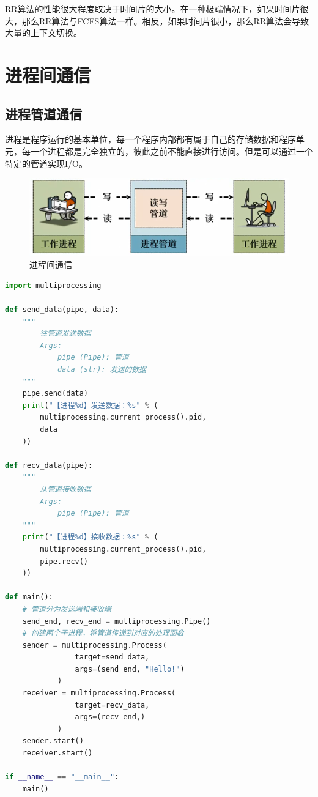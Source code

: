 RR算法的性能很大程度取决于时间片的大小。在一种极端情况下，如果时间片很大，那么RR算法与FCFS算法一样。相反，如果时间片很小，那么RR算法会导致大量的上下文切换。

\newpage

\section{进程间通信}

\subsection{进程管道通信}

进程是程序运行的基本单位，每一个程序内部都有属于自己的存储数据和程序单元，每一个进程都是完全独立的，彼此之前不能直接进行访问。但是可以通过一个特定的管道实现I/O。

\begin{figure}[H]
    \centering
    \includegraphics[]{img/C2/2-5/1.png}
    \caption{进程间通信}
\end{figure}


\begin{lstlisting}[language=Python]
import multiprocessing

def send_data(pipe, data):
	"""
		往管道发送数据
		Args:
			pipe (Pipe): 管道
			data (str): 发送的数据
	"""
	pipe.send(data)
	print("【进程%d】发送数据：%s" % (
		multiprocessing.current_process().pid,
		data
	))

def recv_data(pipe):
	"""
		从管道接收数据
		Args:
			pipe (Pipe): 管道
	"""
	print("【进程%d】接收数据：%s" % (
		multiprocessing.current_process().pid, 
		pipe.recv()
	))

def main():
	# 管道分为发送端和接收端
	send_end, recv_end = multiprocessing.Pipe()
	# 创建两个子进程，将管道传递到对应的处理函数
	sender = multiprocessing.Process(
				target=send_data,
				args=(send_end, "Hello!")
			)
	receiver = multiprocessing.Process(
				target=recv_data,
				args=(recv_end,)
			)
	sender.start()
	receiver.start()

if __name__ == "__main__":
	main()
\end{lstlisting}

